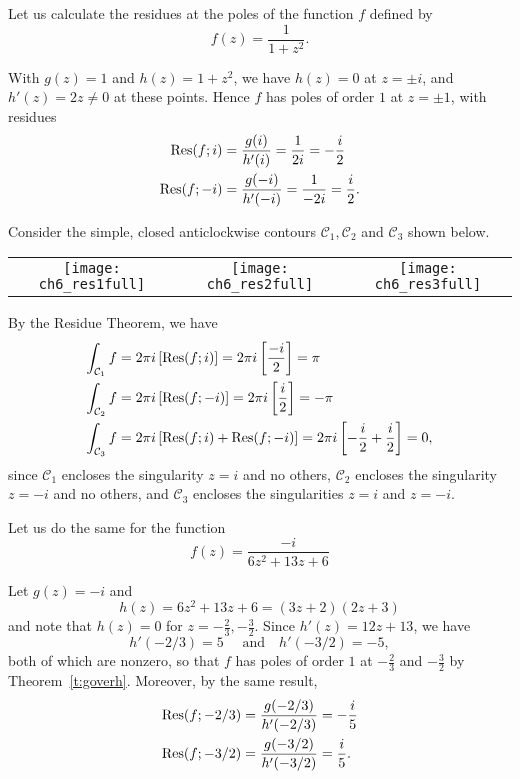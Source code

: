 \begin{example}
Let us calculate the residues at the poles of the function $f$ defined by
\[
f(z) = \frac{1}{1+z^2}.
\]
\end{example}
\begin{solution}
With $g(z)=1$ and $h(z)=1+z^2$, we have $h(z)=0$ at $z=\pm i$, and $h'(z)=2z \neq 0$ at these points.
Hence $f$ has poles of order $1$ at $z=\pm 1$, with residues
\begin{align*}
\mathrm{Res} (f;i ) & = \frac{g(i)}{h'(i)} = \frac{1}{2i} = - \frac{i}{2} \\
\mathrm{Res} (f;-i) & = \frac{g(-i)}{h'(-i)} = \frac{1}{-2i} = \frac{i}{2}.
\end{align*}

Consider the simple, closed anticlockwise contours $\mathcal{C}_1,\mathcal{C}_2$ and $\mathcal{C}_3$ shown below.
\begin{center}
\begin{tabular}{ccc}
\texttt{[image: ch6\_res1full]} & \texttt{[image: ch6\_res2full]} & \texttt{[image: ch6\_res3full]}
\end{tabular}
\end{center}
By the Residue Theorem, we have
\begin{align*}
\int_{\mathcal{C}_1} f &= 2\pi i \left[ \mathrm{Res} (f;i) \right] = 2\pi i \left[ \frac{-i}{2} \right] = \pi \\
\int_{\mathcal{C}_2} f &= 2\pi i \left[ \mathrm{Res} (f;-i) \right] =2\pi i \left[ \frac{i}{2} \right] = -\pi\\
\int_{\mathcal{C}_3} f &= 2\pi i \left[ \mathrm{Res} (f;i)+\mathrm{Res}(f;-i) \right] = 2\pi i \left[ -\frac{i}{2} + \frac{i}{2} \right] = 0,
\end{align*}
since $\mathcal{C}_1$ encloses the singularity $z=i$ and no others, $\mathcal{C}_2$ encloses the singularity $z=-i$ and no others, and $\mathcal{C}_3$ encloses the singularities $z=i$ and $z=-i$.
\end{solution}
\begin{example}
Let us do the same for the function
\[
f(z) = \frac{-i}{6z^2+13z+6}
\]
\end{example}
\begin{solution}
Let $g(z)=-i$ and 
\[
h(z) = 6z^2+13z+6 = (3z+2)(2z+3)
\]
and note that $h(z)=0$ for $z=-\frac{2}{3},-\frac{3}{2}$.  Since $h'(z)=12z+13$, we have
\[
h'(-2/3)  = 5 \quad\text{ and}\quad h'(-3/2) = -5,
\]
both of which are nonzero, so that $f$ has poles of order $1$ at $-\frac{2}{3}$ and $-\frac{3}{2}$ by Theorem~\ref{t:goverh}.  Moreover, by the same result,
\begin{align*}
\mathrm{Res}(f;-2/3) & = \frac{g(-2/3)}{h'(-2/3)} = - \frac{i}{5} \\
\mathrm{Res} (f;-3/2) & = \frac{g(-3/2)}{h'(-3/2)} = \frac{i}{5}.
\end{align*}
\end{solution}
